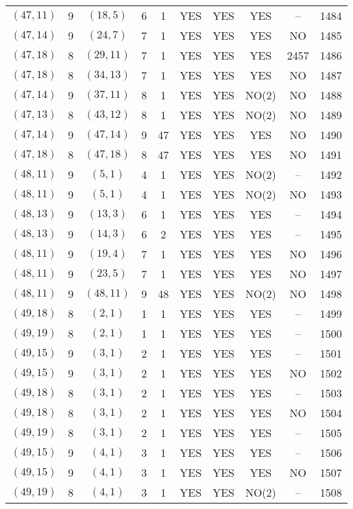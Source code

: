 \begin{longtable}{|c|c|c|c|c|c|c|c|c|c|}
$(47, 11)$ & 9 & $(18, 5)$ & 6 & 1 & YES & YES & YES & -- & 1484\\
$(47, 14)$ & 9 & $(24, 7)$ & 7 & 1 & YES & YES & YES & NO & 1485\\
$(47, 18)$ & 8 & $(29, 11)$ & 7 & 1 & YES & YES & YES & 2457 & 1486\\
$(47, 18)$ & 8 & $(34, 13)$ & 7 & 1 & YES & YES & YES & NO & 1487\\
$(47, 14)$ & 9 & $(37, 11)$ & 8 & 1 & YES & YES & NO(2) & NO & 1488\\
$(47, 13)$ & 8 & $(43, 12)$ & 8 & 1 & YES & YES & NO(2) & NO & 1489\\
$(47, 14)$ & 9 & $(47, 14)$ & 9 & 47 & YES & YES & YES & NO & 1490\\
$(47, 18)$ & 8 & $(47, 18)$ & 8 & 47 & YES & YES & YES & NO & 1491\\
$(48, 11)$ & 9 & $(5, 1)$ & 4 & 1 & YES & YES & NO(2) & -- & 1492\\
$(48, 11)$ & 9 & $(5, 1)$ & 4 & 1 & YES & YES & NO(2) & NO & 1493\\
$(48, 13)$ & 9 & $(13, 3)$ & 6 & 1 & YES & YES & YES & -- & 1494\\
$(48, 13)$ & 9 & $(14, 3)$ & 6 & 2 & YES & YES & YES & -- & 1495\\
$(48, 11)$ & 9 & $(19, 4)$ & 7 & 1 & YES & YES & YES & NO & 1496\\
$(48, 11)$ & 9 & $(23, 5)$ & 7 & 1 & YES & YES & YES & NO & 1497\\
$(48, 11)$ & 9 & $(48, 11)$ & 9 & 48 & YES & YES & NO(2) & NO & 1498\\
$(49, 18)$ & 8 & $(2, 1)$ & 1 & 1 & YES & YES & YES & -- & 1499\\
$(49, 19)$ & 8 & $(2, 1)$ & 1 & 1 & YES & YES & YES & -- & 1500\\
$(49, 15)$ & 9 & $(3, 1)$ & 2 & 1 & YES & YES & YES & -- & 1501\\
$(49, 15)$ & 9 & $(3, 1)$ & 2 & 1 & YES & YES & YES & NO & 1502\\
$(49, 18)$ & 8 & $(3, 1)$ & 2 & 1 & YES & YES & YES & -- & 1503\\
$(49, 18)$ & 8 & $(3, 1)$ & 2 & 1 & YES & YES & YES & NO & 1504\\
$(49, 19)$ & 8 & $(3, 1)$ & 2 & 1 & YES & YES & YES & -- & 1505\\
$(49, 15)$ & 9 & $(4, 1)$ & 3 & 1 & YES & YES & YES & -- & 1506\\
$(49, 15)$ & 9 & $(4, 1)$ & 3 & 1 & YES & YES & YES & NO & 1507\\
$(49, 19)$ & 8 & $(4, 1)$ & 3 & 1 & YES & YES & NO(2) & -- & 1508\\

\end{longtable}

